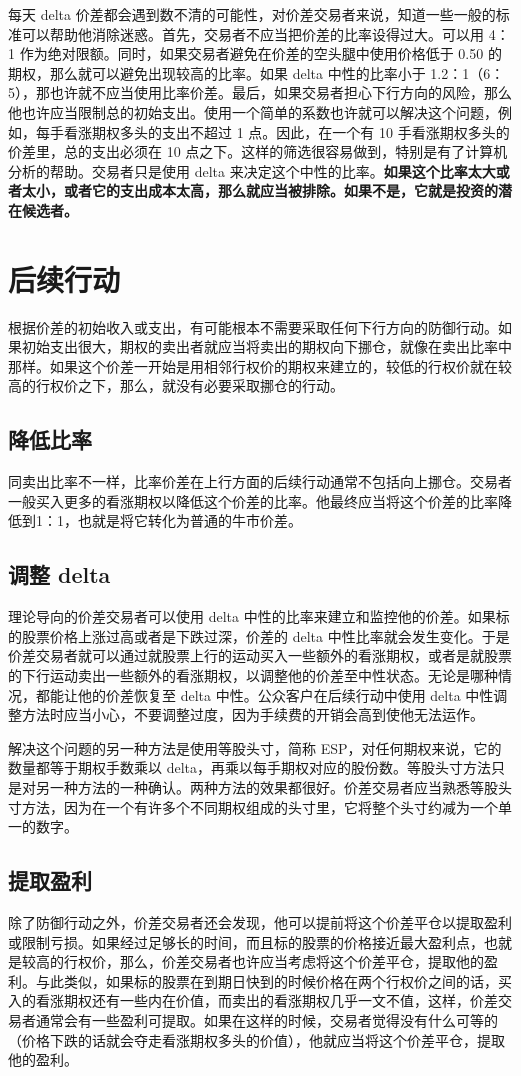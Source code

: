 每天 delta 价差都会遇到数不清的可能性，对价差交易者来说，知道一些一般的标准可以帮助他消除迷惑。首先，交易者不应当把价差的比率设得过大。可以用 4：1 作为绝对限额。同时，如果交易者避免在价差的空头腿中使用价格低于 0.50 的期权，那么就可以避免出现较高的比率。如果 delta 中性的比率小于 1.2：1（6：5），那也许就不应当使用比率价差。最后，如果交易者担心下行方向的风险，那么他也许应当限制总的初始支出。使用一个简单的系数也许就可以解决这个问题，例如，每手看涨期权多头的支出不超过 1 点。因此，在一个有 10 手看涨期权多头的价差里，总的支出必须在 10 点之下。这样的筛选很容易做到，特别是有了计算机分析的帮助。交易者只是使用 delta 来决定这个中性的比率。\textbf{如果这个比率太大或者太小，或者它的支出成本太高，那么就应当被排除。如果不是，它就是投资的潜在候选者。}

\section{后续行动}
根据价差的初始收入或支出，有可能根本不需要采取任何下行方向的防御行动。如果初始支出很大，期权的卖出者就应当将卖出的期权向下挪仓，就像在卖出比率中那样。如果这个价差一开始是用相邻行权价的期权来建立的，较低的行权价就在较高的行权价之下，那么，就没有必要采取挪仓的行动。
\subsection{降低比率}
同卖出比率不一样，比率价差在上行方面的后续行动通常不包括向上挪仓。交易者一般买入更多的看涨期权以降低这个价差的比率。他最终应当将这个价差的比率降低到1：1，也就是将它转化为普通的牛市价差。
\subsection{调整 delta}
理论导向的价差交易者可以使用 delta 中性的比率来建立和监控他的价差。如果标的股票价格上涨过高或者是下跌过深，价差的 delta 中性比率就会发生变化。于是价差交易者就可以通过就股票上行的运动买入一些额外的看涨期权，或者是就股票的下行运动卖出一些额外的看涨期权，以调整他的价差至中性状态。无论是哪种情况，都能让他的价差恢复至 delta 中性。公众客户在后续行动中使用 delta 中性调整方法时应当小心，不要调整过度，因为手续费的开销会高到使他无法运作。

解决这个问题的另一种方法是使用等股头寸，简称 ESP，对任何期权来说，它的数量都等于期权手数乘以 delta，再乘以每手期权对应的股份数。等股头寸方法只是对另一种方法的一种确认。两种方法的效果都很好。价差交易者应当熟悉等股头寸方法，因为在一个有许多个不同期权组成的头寸里，它将整个头寸约减为一个单一的数字。
\subsection{提取盈利}
除了防御行动之外，价差交易者还会发现，他可以提前将这个价差平仓以提取盈利或限制亏损。如果经过足够长的时间，而且标的股票的价格接近最大盈利点，也就是较高的行权价，那么，价差交易者也许应当考虑将这个价差平仓，提取他的盈利。与此类似，如果标的股票在到期日快到的时候价格在两个行权价之间的话，买入的看涨期权还有一些内在价值，而卖出的看涨期权几乎一文不值，这样，价差交易者通常会有一些盈利可提取。如果在这样的时候，交易者觉得没有什么可等的（价格下跌的话就会夺走看涨期权多头的价值），他就应当将这个价差平仓，提取他的盈利。
